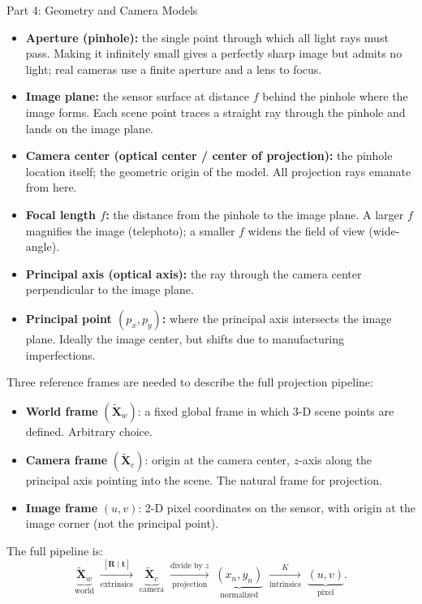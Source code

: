 \documentclass[letterpaper]{article}
\begin{document}
\begin{notes}{Part 4: Geometry and Camera Models}
\begin{itemize}[noitemsep]
  \item \textbf{Aperture (pinhole):} the single point through which all light
        rays must pass.  Making it infinitely small gives a perfectly sharp
        image but admits no light; real cameras use a finite aperture and a
        lens to focus.
  \item \textbf{Image plane:} the sensor surface at distance $f$ behind the
        pinhole where the image forms.  Each scene point traces a straight ray
        through the pinhole and lands on the image plane.
  \item \textbf{Camera center (optical center / center of projection):} the
        pinhole location itself; the geometric origin of the model.  All
        projection rays emanate from here.
  \item \textbf{Focal length $f$:} the distance from the pinhole to the image
        plane.  A larger $f$ magnifies the image (telephoto); a smaller $f$
        widens the field of view (wide-angle).
  \item \textbf{Principal axis (optical axis):} the ray through the camera
        center perpendicular to the image plane.
  \item \textbf{Principal point $(p_x, p_y)$:} where the principal axis
        intersects the image plane.  Ideally the image center, but shifts due
        to manufacturing imperfections.
\end{itemize}


Three reference frames are needed to describe the full projection pipeline:

\begin{itemize}[noitemsep]
  \item \textbf{World frame} $(\widetilde{\mathbf{X}}_w)$: a fixed global
        frame in which 3-D scene points are defined.  Arbitrary choice.
  \item \textbf{Camera frame} $(\widetilde{\mathbf{X}}_c)$: origin at the
        camera center, $z$-axis along the principal axis pointing into the
        scene.  The natural frame for projection.
  \item \textbf{Image frame} $(u, v)$: 2-D pixel coordinates on the sensor,
        with origin at the image corner (not the principal point).
\end{itemize}

The full pipeline is:
\[
  \underbrace{\widetilde{\mathbf{X}}_w}_{\text{world}}
  \;\xrightarrow[\text{extrinsics}]{[\mathbf{R}\mid\mathbf{t}]}\;
  \underbrace{\widetilde{\mathbf{X}}_c}_{\text{camera}}
  \;\xrightarrow[\text{projection}]{\text{divide by }z}\;
  \underbrace{(x_n, y_n)}_{\text{normalized}}
  \;\xrightarrow[\text{intrinsics}]{K}\;
  \underbrace{(u, v)}_{\text{pixel}}.
\]


\end{notes}
\end{document}
